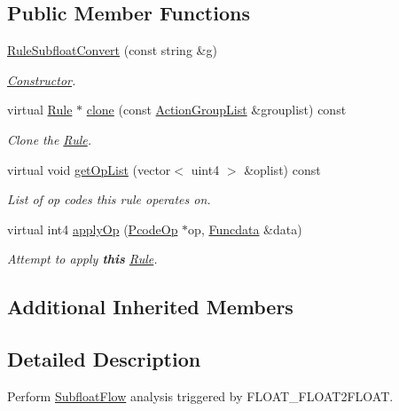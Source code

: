 \subsection*{Public Member Functions}
\begin{DoxyCompactItemize}
\item 
\mbox{\hyperlink{class_rule_subfloat_convert_af755e88d66f2d4b0103c2fcda26b55e0}{Rule\+Subfloat\+Convert}} (const string \&g)
\begin{DoxyCompactList}\small\item\em \mbox{\hyperlink{class_constructor}{Constructor}}. \end{DoxyCompactList}\item 
virtual \mbox{\hyperlink{class_rule}{Rule}} $\ast$ \mbox{\hyperlink{class_rule_subfloat_convert_a017d2e6711abb9521250a93a85938856}{clone}} (const \mbox{\hyperlink{class_action_group_list}{Action\+Group\+List}} \&grouplist) const
\begin{DoxyCompactList}\small\item\em Clone the \mbox{\hyperlink{class_rule}{Rule}}. \end{DoxyCompactList}\item 
virtual void \mbox{\hyperlink{class_rule_subfloat_convert_a68e8f0b1861ca36ef9c19cf166533008}{get\+Op\+List}} (vector$<$ uint4 $>$ \&oplist) const
\begin{DoxyCompactList}\small\item\em List of op codes this rule operates on. \end{DoxyCompactList}\item 
virtual int4 \mbox{\hyperlink{class_rule_subfloat_convert_a53fecdf028f4d41f37ff015677d7731d}{apply\+Op}} (\mbox{\hyperlink{class_pcode_op}{Pcode\+Op}} $\ast$op, \mbox{\hyperlink{class_funcdata}{Funcdata}} \&data)
\begin{DoxyCompactList}\small\item\em Attempt to apply {\bfseries{this}} \mbox{\hyperlink{class_rule}{Rule}}. \end{DoxyCompactList}\end{DoxyCompactItemize}
\subsection*{Additional Inherited Members}


\subsection{Detailed Description}
Perform \mbox{\hyperlink{class_subfloat_flow}{Subfloat\+Flow}} analysis triggered by F\+L\+O\+A\+T\+\_\+\+F\+L\+O\+A\+T2\+F\+L\+O\+AT. 

